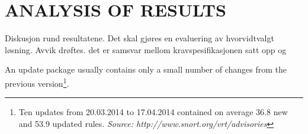 \chapter{ANALYSIS OF RESULTS}
\label{chap:analysis_of_results}
Diskusjon rund resultatene. Det skal gjøres en evaluering av hvorvidtvalgt løsning. Avvik drøftes.
det er samsvar mellom kravspesifikasjonen satt opp og

An update package usually contains only a small number of changes from the
previous version\footnote{Ten updates from 20.03.2014 to 17.04.2014 contained
on average 36.8 new and 53.9 updated rules. \textit{Source:
http://www.snort.org/vrt/advisories}}.
